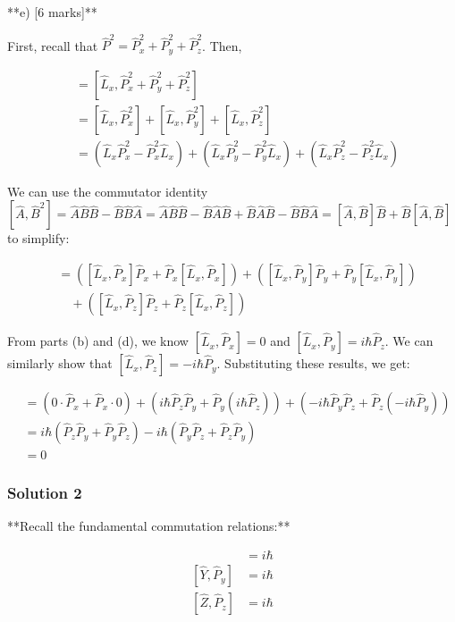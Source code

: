\documentclass{article}
\begin{document}
**e) [6 marks]**

First, recall that $\hat{P}^2 = \hat{P}_x^2 + \hat{P}_y^2 + \hat{P}_z^2$.  Then,

\begin{align*}
[\hat{L}_x, \hat{P}^2] &= [\hat{L}_x, \hat{P}_x^2 + \hat{P}_y^2 + \hat{P}_z^2] \\
&= [\hat{L}_x, \hat{P}_x^2] + [\hat{L}_x, \hat{P}_y^2] + [\hat{L}_x, \hat{P}_z^2] \\
&= (\hat{L}_x \hat{P}_x^2 - \hat{P}_x^2 \hat{L}_x) + (\hat{L}_x \hat{P}_y^2 - \hat{P}_y^2 \hat{L}_x) + (\hat{L}_x \hat{P}_z^2 - \hat{P}_z^2 \hat{L}_x)
\end{align*}

We can use the commutator identity $[\hat{A}, \hat{B}^2] = \hat{A}\hat{B}\hat{B} - \hat{B}\hat{B}\hat{A} = \hat{A}\hat{B}\hat{B} - \hat{B}\hat{A}\hat{B} + \hat{B}\hat{A}\hat{B} - \hat{B}\hat{B}\hat{A} = [\hat{A}, \hat{B}]\hat{B} + \hat{B}[\hat{A}, \hat{B}]$ to simplify:

\begin{align*}
[\hat{L}_x, \hat{P}^2] &= ([\hat{L}_x, \hat{P}_x]\hat{P}_x + \hat{P}_x[\hat{L}_x, \hat{P}_x]) + ([\hat{L}_x, \hat{P}_y]\hat{P}_y + \hat{P}_y[\hat{L}_x, \hat{P}_y]) \\
&\quad + ([\hat{L}_x, \hat{P}_z]\hat{P}_z + \hat{P}_z[\hat{L}_x, \hat{P}_z]) 
\end{align*}

From parts (b) and (d), we know $[\hat{L}_x, \hat{P}_x] = 0$ and $[\hat{L}_x, \hat{P}_y] = i\hbar \hat{P}_z$.  We can similarly show that $[\hat{L}_x, \hat{P}_z] = -i\hbar \hat{P}_y$.  Substituting these results, we get:

\begin{align*}
[\hat{L}_x, \hat{P}^2] &= (0 \cdot \hat{P}_x + \hat{P}_x \cdot 0) + (i\hbar \hat{P}_z \hat{P}_y + \hat{P}_y (i\hbar \hat{P}_z)) + (-i\hbar \hat{P}_y \hat{P}_z + \hat{P}_z (-i\hbar \hat{P}_y)) \\
&= i\hbar (\hat{P}_z \hat{P}_y + \hat{P}_y \hat{P}_z) - i\hbar (\hat{P}_y \hat{P}_z + \hat{P}_z \hat{P}_y) \\
&= 0
\end{align*}

\subsubsection{Solution 2}
**Recall the fundamental commutation relations:**

\begin{align*}
[\hat{X}, \hat{P}_x] &= i\hbar \\
[\hat{Y}, \hat{P}_y] &= i\hbar \\
[\hat{Z}, \hat{P}_z] &= i\hbar
\end{align*}
\end{document}
